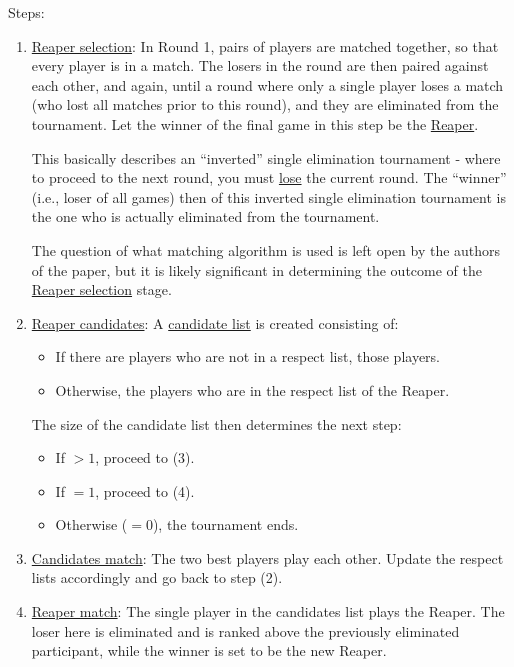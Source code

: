 \documentclass[a4,11pt,twoside,final]{article}
\begin{document}
Steps:
\begin{enumerate}
\item \uline{Reaper selection}: In Round 1, pairs of players are matched together, so that
every player is in a match. The losers in the round are then paired against
each other, and again, until a round where only a single player loses a match
(who lost all matches prior to this round), and they are eliminated from the
tournament. Let the winner of the final game in this step be the \uline{Reaper}.

This basically describes an ``inverted'' single elimination tournament - where
to proceed to the next round, you must \uline{lose} the current round. The ``winner''
(i.e., loser of all games) then of this inverted single elimination
tournament is the one who is actually eliminated from the tournament.

The question of what matching algorithm is used is left open by the authors
of the paper, but it is likely significant in determining the outcome of the
\uline{Reaper selection} stage.

\item \uline{Reaper candidates}: A \uline{candidate list} is created consisting of:
\begin{itemize}
\item If there are players who are not in a respect list, those players.
\item Otherwise, the players who are in the respect list of the Reaper.
\end{itemize}

The size of the candidate list then determines the next step:
\begin{itemize}
\item If \(> 1\), proceed to (3).
\item If \(= 1\), proceed to (4).
\item Otherwise (\(= 0\)), the tournament ends.
\end{itemize}

\item \uline{Candidates match}: The two best players play each other. Update the respect
lists accordingly and go back to step (2).

\item \uline{Reaper match}: The single player in the candidates list plays the Reaper. The
loser here is eliminated and is ranked above the previously eliminated
participant, while the winner is set to be the new Reaper.
\end{enumerate}
\end{document}

